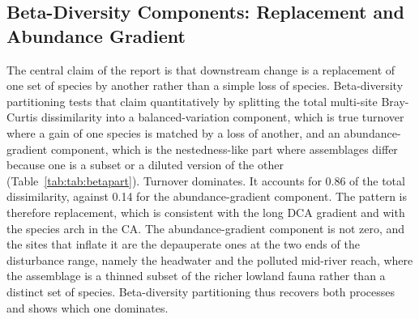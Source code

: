 \documentclass[11pt]{article}
\begin{document}
\subsection{Beta-Diversity Components: Replacement and Abundance Gradient}
The central claim of the report is that downstream change is a replacement of one set of species by another rather than a simple loss of species. Beta-diversity partitioning tests that claim quantitatively by splitting the total multi-site Bray-Curtis dissimilarity into a balanced-variation component, which is true turnover where a gain of one species is matched by a loss of another, and an abundance-gradient component, which is the nestedness-like part where assemblages differ because one is a subset or a diluted version of the other (Table~\ref{tab:tab:betapart}). Turnover dominates. It accounts for 0.86 of the total dissimilarity, against 0.14 for the abundance-gradient component. The pattern is therefore replacement, which is consistent with the long DCA gradient and with the species arch in the CA. The abundance-gradient component is not zero, and the sites that inflate it are the depauperate ones at the two ends of the disturbance range, namely the headwater and the polluted mid-river reach, where the assemblage is a thinned subset of the richer lowland fauna rather than a distinct set of species. Beta-diversity partitioning thus recovers both processes and shows which one dominates.
\begin{table}[!h]
\centering
\caption{\label{tab:tab:betapart}Multi-site beta-diversity partitioning of the fish assemblage into balanced turnover and abundance-gradient components (Baselga family, abundance-based).}
\centering
{}
\end{table}
\end{document}
